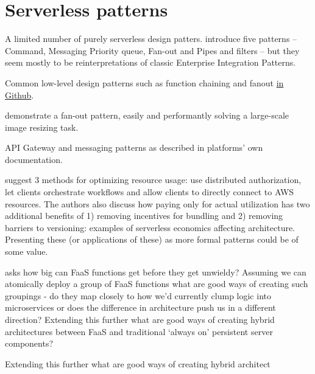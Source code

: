 \documentclass[utf8,english]{gradu3}
\begin{document}
\section{Serverless patterns}


A limited number of purely serverless design patters. \textcite{sbarski2017serverless} introduce five patterns -- Command, Messaging Priority queue, Fan-out and Pipes and filters -- but they seem mostly to be reinterpretations of classic Enterprise Integration Patterns.

Common low-level design patterns such as function chaining and fanout \href{https://github.com/yochay/serverlesspatterns}{in Github}.

\textcite{mcgrath16cloudEventParadigms} demonstrate a fan-out pattern, easily and performantly solving a large-scale image resizing task.

API Gateway and messaging patterns as described in platforms' own documentation. \parencite{awslambda0218}

\textcite{adzic2017serverless} suggest 3 methods for optimizing resource usage: use distributed authorization, let clients orchestrate workflows and allow clients to directly connect to AWS resources. The authors also discuss how paying only for actual utilization has two additional benefits of 1) removing incentives for bundling and 2) removing barriers to versioning: examples of serverless economics affecting architecture. Presenting these (or applications of these) as more formal patterns could be of some value.

\textcite{robert2016serverlessarchitectures} asks how big can FaaS functions get before they get unwieldy? Assuming we can atomically deploy a group of FaaS functions what are good ways of creating such groupings - do they map closely to how we’d currently clump logic into microservices or does the difference in architecture push us in a different direction? Extending this further what are good ways of creating hybrid architectures between FaaS and traditional ‘always on’ persistent server components?

Extending this further what are good ways of creating hybrid architect
\end{document}
